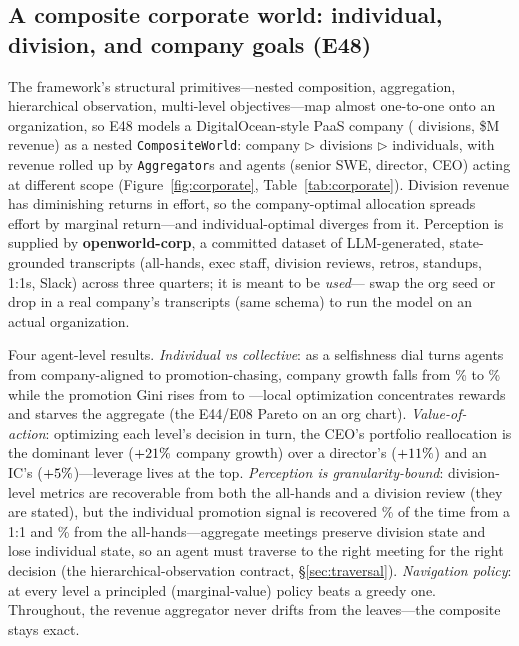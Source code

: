 \documentclass[11pt]{article}
\begin{document}
\begin{table}[htb]
\centering
\caption{\textbf{E45 next-token length generalization.} Per-task next-character
exact accuracy, in-distribution (lengths $\le\NextTokTrainLen$) and OOD (out to
\NextTokMaxLen). Only the synthesised symbolic program is exact OOD.}
\label{tab:next-token}

\end{table}

\subsection{A composite corporate world: individual, division, and company goals (E48)}\label{sec:corporate}
The framework's structural primitives---nested composition, aggregation,
hierarchical observation, multi-level objectives---map almost one-to-one onto an
organization, so E48 models a DigitalOcean-style PaaS company
(\CorpDivisions{} divisions, \$\CorpRevenue{}M revenue) as a nested
\texttt{CompositeWorld}: company $\triangleright$ divisions $\triangleright$
individuals, with revenue rolled up by \texttt{Aggregator}s and agents (senior
SWE, director, CEO) acting at different scope (Figure~\ref{fig:corporate},
Table~\ref{tab:corporate}). Division revenue has diminishing returns in effort,
so the company-optimal allocation spreads effort by marginal return---and
individual-optimal diverges from it. Perception is supplied by
\textbf{openworld-corp}, a committed dataset of \CorpTranscripts{} LLM-generated,
state-grounded transcripts (all-hands, exec staff, division reviews, retros,
standups, 1:1s, Slack) across three quarters; it is meant to be \emph{used}---
swap the org seed or drop in a real company's transcripts (same schema) to run
the model on an actual organization.

Four agent-level results. \emph{Individual vs collective}: as a selfishness dial
turns agents from company-aligned to promotion-chasing, company growth falls from
\CorpAlignedGrowth\% to \CorpSelfishGrowth\% while the promotion Gini rises from
\CorpAlignedGini{} to \CorpSelfishGini---local optimization concentrates rewards
and starves the aggregate (the E44/E08 Pareto on an org chart). \emph{Value-of-
action}: optimizing each level's decision in turn, the CEO's portfolio
reallocation is the dominant lever ($+21\%$ company growth) over a
director's ($+11\%$) and an IC's ($+5\%$)---leverage lives at
the top. \emph{Perception is granularity-bound}: division-level metrics are
recoverable from both the all-hands and a division review (they are stated), but
the individual promotion signal is recovered \CorpIndivOneOnOne\% of the time
from a 1:1 and \CorpIndivAllHands\% from the all-hands---aggregate meetings
preserve division state and lose individual state, so an agent must traverse to
the right meeting for the right decision (the hierarchical-observation contract,
\S\ref{sec:traversal}). \emph{Navigation policy}: at every level a principled
(marginal-value) policy beats a greedy one. Throughout, the revenue aggregator
never drifts from the leaves---the composite stays exact.
\end{document}
